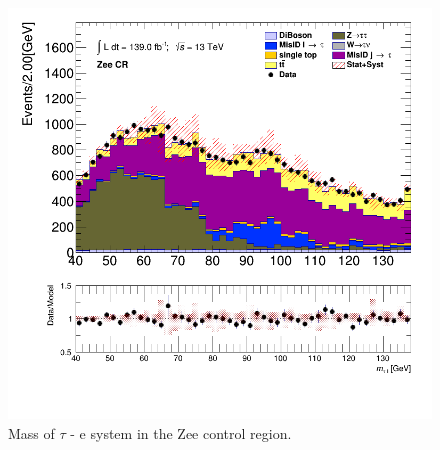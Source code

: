 		\begin{figure}[!thp]
			\centering
			\includegraphics[width=.5\textwidth,keepaspectratio=true]{chapters/chapter6_HPlus/images/taulep/tau_0_lep_0_mass_ZEE.png}
			\caption{Mass of $\tau$ - e system in the Zee control region.}
			\label{fig:zee-mass}
		\end{figure}

